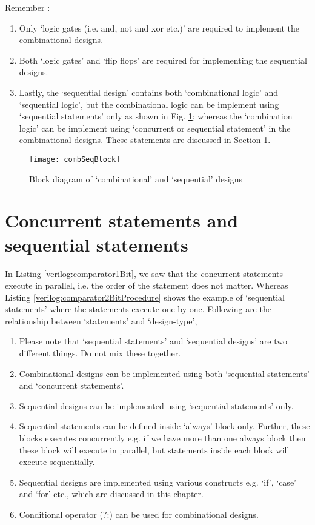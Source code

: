 \begin{noNumBox}
	Remember : 
	\begin{enumerate}
		\item Only `logic gates (i.e. and, not and xor etc.)' are required to implement the combinational designs.
		\item Both `logic gates' and `flip flops' are required for implementing the sequential designs. 
		\item Lastly, the `sequential design' contains both `combinational logic' and `sequential logic', but the combinational logic can be implement using `sequential statements' only as shown in Fig. \ref{fig:combSeqBlock}; whereas the `combination logic' can be implement using `concurrent or sequential statement' in the combinational designs. These statements are discussed in Section \ref{sec:concurrentSeq}. 
	\end{enumerate}
\end{noNumBox}

\begin{figure}[!h]
	\centering
	\texttt{[image: combSeqBlock]}
	\caption{Block diagram of `combinational' and `sequential' designs}
	\label{fig:combSeqBlock}
\end{figure}


\section{Concurrent statements and sequential statements}\label{sec:concurrentSeq}

In Listing \ref{verilog:comparator1Bit}, we saw that the concurrent statements execute in parallel, i.e. the order of the statement does not matter. Whereas Listing \ref{verilog:comparator2BitProcedure} shows the example of `sequential statements' where the statements execute one by one. Following are the relationship between `statements' and `design-type',

\begin{enumerate}
	\item Please note that `sequential statements' and `sequential designs' are two different things. Do not mix these together.
	\item Combinational designs can be implemented using both `sequential statements' and `concurrent statements'. 
	\item Sequential designs can be implemented using `sequential statements' only. 
	\item Sequential statements can be defined inside `always' block only. Further, these blocks executes concurrently e.g. if we have more than one always block then these block will execute in parallel, but statements inside each block will execute sequentially. 
	\item Sequential designs are implemented using various constructs e.g. `if', `case' and `for' etc., which are discussed in this chapter.
	\item Conditional operator (?:) can be used for combinational designs. 
\end{enumerate}


